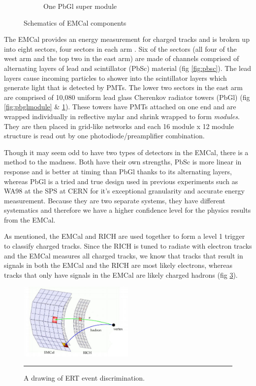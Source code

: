 \begin{figure}
\begin{subfigure}[b]{0.6\textwidth}
    \caption{One PbGl super module}
\label{fig:pbglsupmodule}
\end{subfigure}
\caption[Schematics of EMCal components]{Schematics of EMCal components}
\label{fig:EMCalcomponents}
\end{figure}
\dsp

The EMCal provides an energy measurement for charged tracks and is broken up into eight sectors, four sectors in each arm \citep{EMCfocus}. Six of the sectors (all four of the west arm and the top two in the east arm) are made of channels comprised of alternating layers of lead and scintillator (PbSc) material (fig \ref{fig:pbsc}). The lead layers cause incoming particles to shower into the scintillator layers which generate light that is detected by PMTs. The lower two sectors in the east arm are comprised of 10,080 uniform lead glass Cherenkov radiator towers (PbGl) (fig \ref{fig:pbglmodule} \& \ref{fig:pbglsupmodule}). These towers have PMTs attached on one end and are wrapped individually in reflective mylar and shrink wrapped to form \textit{modules}. They are then placed in grid-like networks and each 16 module x 12 module structure is read out by one photodiode/preamplifier combination. 

Though it may seem odd to have two types of detectors in the EMCal, there is a method to the madness. Both have their own strengths, PbSc is more linear in response and is better at timing than PbGl thanks to its alternating layers, whereas PbGl is a tried and true design used in previous experiments such as WA98 at the SPS at CERN for it's exceptional granularity and accurate energy measurement. Because they are two separate systems, they have different systematics and therefore we have a higher confidence level for the physics results from the EMCal. 

As mentioned, the EMCal and RICH are used together to form a level 1 trigger to classify charged tracks. Since the RICH is tuned to radiate with electron tracks and the EMCal measures all charged tracks, we know that tracks that result in signals in both the EMCal and the RICH are most likely electrons, whereas tracks that only have signals in the EMCal are likely charged hadrons (fig \ref{fig:ERT}).
\begin{figure}[h!]
  \centering
    \includegraphics[width=0.5\textwidth]{Figures/ERT.jpg}
    \rule{35em}{0.5pt}
  \caption[A drawing of ERT event discrimination.]{A drawing of ERT event discrimination.}
  \label{fig:ERT}
\end{figure}

